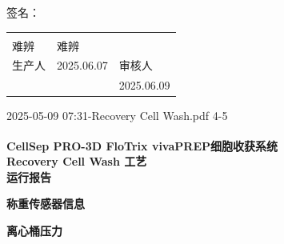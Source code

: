 \documentclass[UTF8,10pt,a4paper,fontset=fandol]{ctexart}
\newcommand{\fieldvalue}[1]{#1}
\newcommand{\handwritten}[1]{#1}
\begin{document}
\vfill

签名：

\begin{tabularx}{0.85\textwidth}{@{}>{\centering\arraybackslash}X
>{\centering\arraybackslash}X
>{\centering\arraybackslash}X@{}}
\hrulefill & \hrulefill & \hrulefill\\[-1.2ex]
\fieldvalue{\handwritten{难辨}} &
\fieldvalue{\handwritten{难辨}} &
\\[1ex]
生产人 &
\fieldvalue{\handwritten{2025.06.07}} &
审核人\\
&
&
\fieldvalue{\handwritten{2025.06.09}}
\end{tabularx}

\noindent\footnotesize 2025-05-09 07:31-Recovery Cell Wash.pdf \hfill 4-5

\newpage

\begin{center}
\textbf{CellSep\textsuperscript{\textregistered} PRO-3D FloTrix\textsuperscript{\textregistered} vivaPREP细胞收获系统}\\
\textbf{Recovery Cell Wash 工艺}\\[2pt]
{\Large\textbf{运行报告}}
\end{center}

\vspace{0.5em}

\begin{center}
\textbf{称重传感器信息}
\end{center}

\begin{center}
\end{center}

\vspace{0.8em}

\begin{center}
\textbf{离心桶压力}
\end{center}
\end{document}
